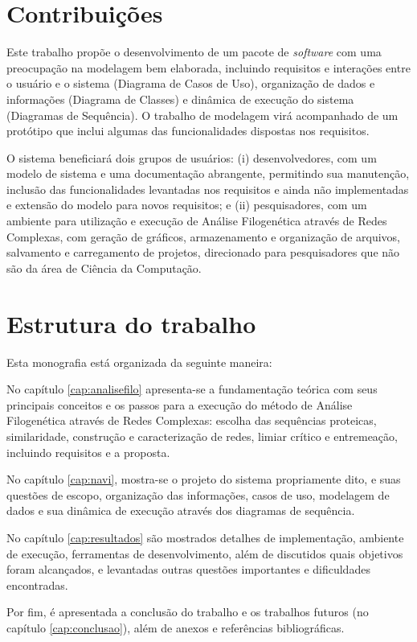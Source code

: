 \section{Contribuições}

Este trabalho propõe o desenvolvimento de um pacote de \textit{software} com uma preocupação na modelagem bem elaborada, incluindo requisitos e
interações entre o usuário
e o sistema (Diagrama de Casos de Uso), organização de dados e informações (Diagrama de Classes) e dinâmica de execução do sistema (Diagramas de Sequência).
O trabalho de modelagem virá acompanhado de um protótipo que inclui algumas das funcionalidades dispostas nos requisitos.

O sistema beneficiará dois grupos de usuários: (i) desenvolvedores, com um modelo de sistema e uma documentação abrangente, permitindo sua
manutenção, inclusão das funcionalidades levantadas nos requisitos e ainda não implementadas e extensão do modelo para novos requisitos; e (ii) pesquisadores,
com um ambiente para utilização e execução de Análise Filogenética através de Redes Complexas, com geração de gráficos, armazenamento e organização de
arquivos, salvamento e carregamento de projetos, direcionado para pesquisadores que não são da área de Ciência da Computação.

\section{Estrutura do trabalho}

Esta monografia está organizada da seguinte maneira:

No capítulo \ref{cap:analisefilo} apresenta-se a fundamentação teórica com seus principais conceitos
e os passos para a execução do método de Análise Filogenética através de Redes Complexas: escolha das sequências proteicas,
similaridade, construção e caracterização de redes, limiar crítico e entremeação, incluindo requisitos e a proposta.

No capítulo \ref{cap:navi}, mostra-se o projeto do sistema propriamente dito, e suas questões
de escopo, organização das informações, casos de uso, modelagem de dados e sua dinâmica de execução através dos diagramas de sequência.

No capítulo \ref{cap:resultados} são mostrados detalhes de implementação, ambiente de execução, ferramentas de
desenvolvimento, além de discutidos quais objetivos foram alcançados, e levantadas outras questões importantes e dificuldades encontradas.

Por fim, é apresentada a conclusão do trabalho e os trabalhos futuros (no capítulo \ref{cap:conclusao}), além de anexos e referências bibliográficas.





